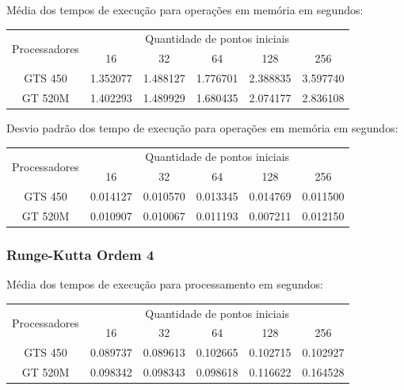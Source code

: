     \hspace{1mm}\newline
    
    \noindent Média dos tempos de execução para operações em memória em segundos:\\
    \begin{tabular}{| c | c | c | c | c | c |}
      \hline
      \multirow{2}{*}{Processadores}& \multicolumn{5}{|c|}{Quantidade de pontos iniciais} \\ \cline{2-6}
      & 16 & 32 & 64 & 128 & 256 \\ \hline
      GTS 450 & 1.352077 & 1.488127 & 1.776701 & 2.388835 & 3.597740 \\ \hline
      GT 520M & 1.402293 & 1.489929 & 1.680435 & 2.074177 & 2.836108\\ \hline

      \hline
    \end{tabular}
    
    \hspace{1mm}\newline
    
    \noindent Desvio padrão dos tempo de execução para operações em memória em segundos:\\
    \begin{tabular}{| c | c | c | c | c | c |}
      \hline
      \multirow{2}{*}{Processadores}& \multicolumn{5}{|c|}{Quantidade de pontos iniciais} \\ \cline{2-6}
      & 16 & 32 & 64 & 128 & 256 \\ \hline
      GTS 450 & 0.014127 & 0.010570 & 0.013345 & 0.014769 & 0.011500 \\ \hline
      GT 520M & 0.010907 & 0.010067 & 0.011193 & 0.007211 & 0.012150 \\ \hline

      \hline
    \end{tabular}
    
    \subsubsection{Runge-Kutta Ordem 4} 
    Média dos tempos de execução para processamento em segundos:\\
    \begin{tabular}{| c | c | c | c | c | c |}
      \hline
      \multirow{2}{*}{Processadores}& \multicolumn{5}{|c|}{Quantidade de pontos iniciais} \\ \cline{2-6}
      & 16 & 32 & 64 & 128 & 256 \\ \hline
      GTS 450 & 0.089737 & 0.089613 & 0.102665 & 0.102715 & 0.102927\\ \hline
      GT 520M & 0.098342 & 0.098343 & 0.098618 & 0.116622 & 0.164528\\ \hline

      \hline
    \end{tabular}
    

